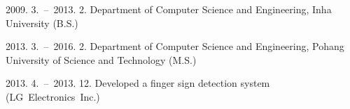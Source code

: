 \documentclass[master,english,final]{postech-ucs}
\begin{document}
    \begin{education}
        \item[2009. 3.\ --\ 2013. 2.] Department of Computer Science and Engineering, Inha University (B.S.)
        \item[2013. 3.\ --\ 2016. 2.] Department of Computer Science and Engineering, Pohang University of Science and Technology (M.S.)
    \end{education}

   \begin{experience}
        \item[2013. 4.\ --\ 2013. 12.] Developed a finger sign detection system (LG~Electronics~Inc.)
   \end{experience}


    \afterpage{\blankpage}  %

\end{document}
